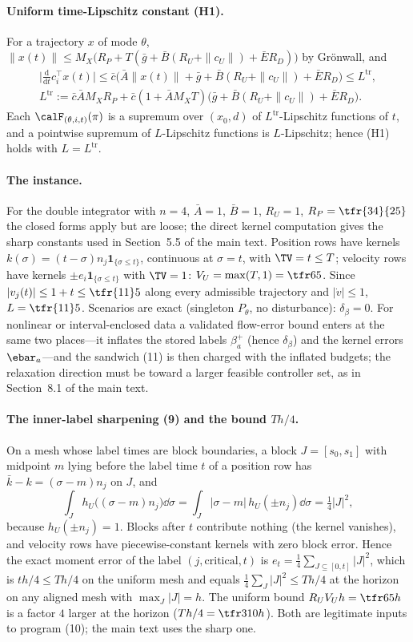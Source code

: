 \paragraph{Uniform time-Lipschitz constant (H1).}
For a trajectory $x$ of mode $\theta$, $\|x(t)\|\le M_X\bigl(R_P+T(\bar g+\bar B(R_U+\|c_U\|)+\bar ER_D)\bigr)$ by Gr\"onwall, and
\begin{gather*}
\bigl|\tfrac{\mathrm d}{\mathrm dt}c_i^\top x(t)\bigr|\le\bar c\bigl(\bar A\|x(t)\|+\bar g+\bar B(R_U+\|c_U\|)+\bar ER_D\bigr)\le L^{\mathrm{tr}},\\
L^{\mathrm{tr}}:=\bar c\bar AM_XR_P+\bar c(1+\bar AM_XT)\bigl(\bar g+\bar B(R_U+\|c_U\|)+\bar ER_D\bigr).
\end{gather*}
Each $\calF_{(\theta,i,t)}(\pi)$ is a supremum over $(x_0,d)$ of $L^{\mathrm{tr}}$-Lipschitz functions of $t$, and a pointwise supremum of $L$-Lipschitz functions is $L$-Lipschitz; hence (H1) holds with $L=L^{\mathrm{tr}}$.

\paragraph{The instance.}
For the double integrator with $n=4$, $\bar A=1$, $\bar B=1$, $R_U=1$, $R_P=\tfr{34}{25}$ the closed forms apply but are loose; the direct kernel computation gives the sharp constants used in Section~5.5 of the main text. Position rows have kernels $k(\sigma)=(t-\sigma)n_j\mathbf 1_{\{\sigma\le t\}}$, continuous at $\sigma=t$, with $\TV=t\le T$; velocity rows have kernels $\pm e_i\mathbf 1_{\{\sigma\le t\}}$ with $\TV=1$: $V_U=\max(T,1)=\tfr65$. Since $|v_j(t)|\le1+t\le\tfr{11}5$ along every admissible trajectory and $|\dot v|\le1$, $L=\tfr{11}5$. Scenarios are exact (singleton $P_\theta$, no disturbance): $\delta_\beta=0$. For nonlinear or interval-enclosed data a validated flow-error bound enters at the same two places---it inflates the stored labels $\beta^+_a$ (hence $\delta_\beta$) and the kernel errors $\ebar_a$---and the sandwich (11) is then charged with the inflated budgets; the relaxation direction must be toward a larger feasible controller set, as in Section~8.1 of the main text.

\paragraph{The inner-label sharpening (9) and the bound $Th/4$.}
On a mesh whose label times are block boundaries, a block $J=[s_0,s_1]$ with midpoint $m$ lying before the label time $t$ of a position row has $\bar k-k=(\sigma-m)n_j$ on $J$, and
\[
\int_Jh_U\bigl((\sigma-m)n_j\bigr)\dd\sigma=\int_J|\sigma-m|\,h_U(\pm n_j)\dd\sigma=\tfrac14|J|^2 ,
\]
because $h_U(\pm n_j)=1$. Blocks after $t$ contribute nothing (the kernel vanishes), and velocity rows have piecewise-constant kernels with zero block error. Hence the exact moment error of the label $(j,\text{critical},t)$ is $e_t=\tfrac14\sum_{J\subseteq[0,t]}|J|^2$, which is $th/4\le Th/4$ on the uniform mesh and equals $\tfrac14\sum_J|J|^2\le Th/4$ at the horizon on any aligned mesh with $\max_J|J|=h$. The uniform bound $R_UV_Uh=\tfr65h$ is a factor $4$ larger at the horizon ($Th/4=\tfr3{10}h$). Both are legitimate inputs to program (10); the main text uses the sharp one.

